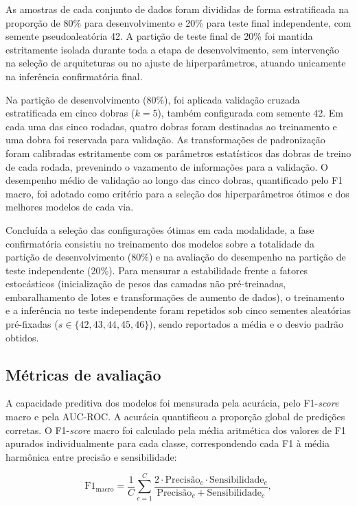 As amostras de cada conjunto de dados foram divididas de forma estratificada na proporção de 80\% para desenvolvimento e 20\% para teste final independente, com semente pseudoaleatória 42. A partição de teste final de 20\% foi mantida estritamente isolada durante toda a etapa de desenvolvimento, sem intervenção na seleção de arquiteturas ou no ajuste de hiperparâmetros, atuando unicamente na inferência confirmatória final.

Na partição de desenvolvimento (80\%), foi aplicada validação cruzada estratificada em cinco dobras ($k = 5$), também configurada com semente 42. Em cada uma das cinco rodadas, quatro dobras foram destinadas ao treinamento e uma dobra foi reservada para validação. As transformações de padronização foram calibradas estritamente com os parâmetros estatísticos das dobras de treino de cada rodada, prevenindo o vazamento de informações para a validação. O desempenho médio de validação ao longo das cinco dobras, quantificado pelo F1 macro, foi adotado como critério para a seleção dos hiperparâmetros ótimos e dos melhores modelos de cada via.

Concluída a seleção das configurações ótimas em cada modalidade, a fase confirmatória consistiu no treinamento dos modelos sobre a totalidade da partição de desenvolvimento (80\%) e na avaliação do desempenho na partição de teste independente (20\%). Para mensurar a estabilidade frente a fatores estocásticos (inicialização de pesos das camadas não pré-treinadas, embaralhamento de lotes e transformações de aumento de dados), o treinamento e a inferência no teste independente foram repetidos sob cinco sementes aleatórias pré-fixadas ($s \in \{42, 43, 44, 45, 46\}$), sendo reportados a média e o desvio padrão obtidos.



\subsection{Métricas de avaliação}
\label{subsec:metricas}

A capacidade preditiva dos modelos foi mensurada pela acurácia, pelo F1-\textit{score} macro e pela AUC-ROC. A acurácia quantificou a proporção global de predições corretas. O F1-\textit{score} macro foi calculado pela média aritmética dos valores de F1 apurados individualmente para cada classe, correspondendo cada F1 à média harmônica entre precisão e sensibilidade:

\begin{equation}
\text{F1}_{\text{macro}} = \frac{1}{C} \sum_{c=1}^{C} \frac{2 \cdot \text{Precisão}_c \cdot \text{Sensibilidade}_c}{\text{Precisão}_c + \text{Sensibilidade}_c},
\label{eq:met-f1-macro}
\end{equation}

